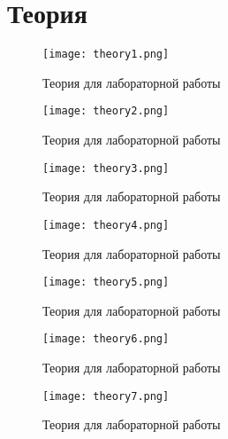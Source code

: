 \chapter{Теория}
\label{ch:intro}

\begin{figure}[H]
    \centering
    \texttt{[image: theory1.png]}
    \caption{Теория для лабораторной работы}
\end{figure}

\begin{figure}[H]
    \centering
    \texttt{[image: theory2.png]}
    \caption{Теория для лабораторной работы}
\end{figure}

\begin{figure}[H]
    \centering
    \texttt{[image: theory3.png]}
    \caption{Теория для лабораторной работы}
\end{figure}

\begin{figure}[H]
    \centering
    \texttt{[image: theory4.png]}
    \caption{Теория для лабораторной работы}
\end{figure}

\begin{figure}[H]
    \centering
    \texttt{[image: theory5.png]}
    \caption{Теория для лабораторной работы}
\end{figure}

\begin{figure}[H]
    \centering
    \texttt{[image: theory6.png]}
    \caption{Теория для лабораторной работы}
\end{figure}

\begin{figure}[H]
    \centering
    \texttt{[image: theory7.png]}
    \caption{Теория для лабораторной работы}
\end{figure}



\endinput
